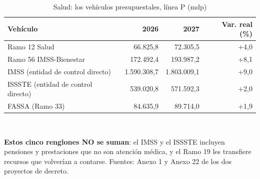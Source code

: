 \begin{table}[htbp]\centering\small
\caption{Salud: los vehículos presupuestales, línea P (mdp)}\label{cua:salud}
\begin{tabular}{lrrr}
\toprule
Vehículo & 2026 & 2027 & Var. real (\%) \\
\midrule
Ramo 12 Salud & 66.825,8 & 72.305,5 & +4,0 \\
Ramo 56 IMSS-Bienestar & 172.492,4 & 193.987,2 & +8,1 \\
IMSS (entidad de control directo) & 1.590.308,7 & 1.803.009,1 & +9,0 \\
ISSSTE (entidad de control directo) & 539.020,8 & 571.592,3 & +2,0 \\
FASSA (Ramo 33) & 84.635,9 & 89.714,0 & +1,9 \\
\bottomrule
\end{tabular}
\\[2pt]\begin{minipage}{0.92\textwidth}\scriptsize \textbf{Estos cinco renglones NO se suman}: el IMSS y el ISSSTE incluyen pensiones y prestaciones que no son atención médica, y el Ramo 19 les transfiere recursos que volverían a contarse. Fuentes: Anexo 1 y Anexo 22 de los dos proyectos de decreto.\end{minipage}
\end{table}
